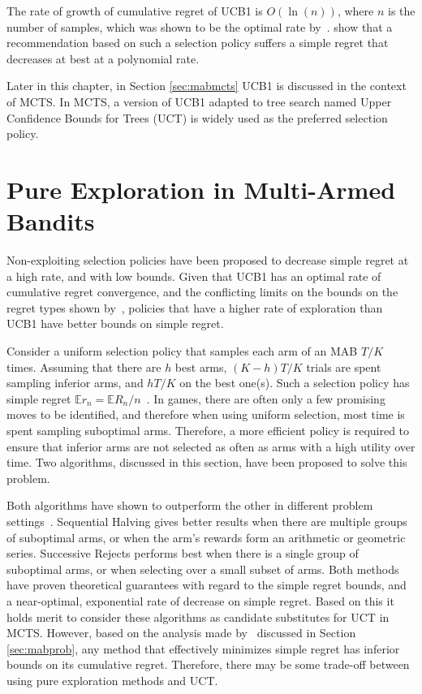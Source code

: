 \documentclass{kecsmstr}
\newcommand{\bE}{\mathbb{E}}
\begin{document}
The rate of growth of cumulative regret of UCB1 is $O(\ln(n))$, where $n$ is the number of samples, which was shown to be the optimal rate by~.  show that a recommendation based on such a selection policy suffers a simple regret that decreases at best at a polynomial rate. 

Later in this chapter, in Section \ref{sec:mabmcts} UCB1 is discussed in the context of MCTS. In MCTS, a version of UCB1 adapted to tree search named Upper Confidence Bounds for Trees (UCT) is widely used as the preferred selection policy.

\section{Pure Exploration in Multi-Armed Bandits}
\label{sec:pureexplmab}
Non-exploiting selection policies have been proposed to decrease simple regret at a high rate, and with low bounds. Given that UCB1 has an optimal rate of cumulative regret convergence, and the conflicting limits on the bounds on the regret types shown by~, policies that have a higher rate of exploration than UCB1 have better bounds on simple regret. 

Consider a uniform selection policy that samples each arm of an MAB $T/K$ times. Assuming that there are $h$ best arms, $(K-h)T/K$ trials are spent sampling inferior arms, and $hT/K$ on the best one(s). Such a selection policy has simple regret $\bE r_n = \bE R_n/n$~.
In games, there are often only a few promising moves to be identified, and therefore when using uniform selection, most time is spent sampling suboptimal arms. Therefore, a more efficient policy is required to ensure that inferior arms are not selected as often as arms with a high utility over time. Two algorithms, discussed in this section, have been proposed to solve this problem.

Both algorithms have shown to outperform the other in different problem settings~. Sequential Halving gives better results when there are multiple groups of suboptimal arms, or when the arm's rewards form an arithmetic or geometric series. Successive Rejects performs best when there is a single group of suboptimal arms, or when selecting over a small subset of arms. Both methods have proven theoretical guarantees with regard to the simple regret bounds, and a near-optimal, exponential rate of decrease on simple regret. Based on this it holds merit to consider these algorithms as candidate substitutes for UCT in MCTS. However, based on the analysis made by~ discussed in Section \ref{sec:mabprob}, any method that effectively minimizes simple regret has inferior bounds on its cumulative regret. Therefore, there may be some trade-off between using pure exploration methods and UCT.
\end{document}
